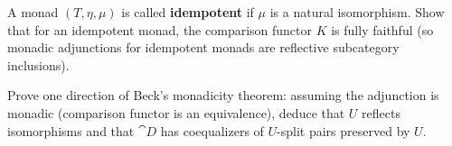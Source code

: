 \begin{exercise}[$\star$]
A monad $(T, \eta, \mu)$ is called \textbf{idempotent} if $\mu$ is a natural isomorphism. Show that for an idempotent monad, the comparison functor $K$ is fully faithful (so monadic adjunctions for idempotent monads are reflective subcategory inclusions).
\end{exercise}

\begin{exercise}[$\star\star$]
Prove one direction of Beck's monadicity theorem: assuming the adjunction is monadic (comparison functor is an equivalence), deduce that $U$ reflects isomorphisms and that $\cat{D}$ has coequalizers of $U$-split pairs preserved by $U$.
\end{exercise}
